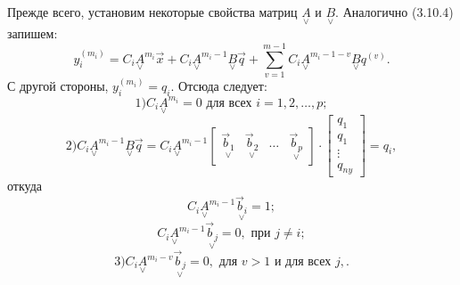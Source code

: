 Прежде всего, установим некоторые свойства матриц $\underset{\lor}{A}$ и $\underset{\lor}{B}$. Аналогично (3.10.4) запишем:
\begin{equation*}
	y_i^{(m_i)}=C_i\underset{\lor}{A}^{m_i}\vec{x}+C_i\underset{\lor}{A}^{m_i-1}\underset{\lor}{B}\vec{q}+\sum_{v=1}^{m-1}C_i\underset{\lor}{A}^{m_i-1-v}\underset{\lor}{B}q^{(v)}.
\end{equation*}
С другой стороны, $y_i^{(m_i)}=q_i$. Отсюда следует:
\begin{equation}
	1) C_i\underset{\lor}{A}^{m_i}=0\text{ для всех }i=1,2,\dots,p;
\end{equation}
\begin{equation}
	2) C_i\underset{\lor}{A}^{m_i-1}\underset{\lor}{B}\vec{q}=C_i\underset{\lor}{A}^{m_i-1}
	\begin{bmatrix}
		 \underset{\lor}{\vec{b}_1} & \underset{\lor}{\vec{b}_2} & \dots & \underset{\lor}{\vec{b}_p}
	\end{bmatrix}\cdot
	\begin{bmatrix}
		 q_1\\q_1\\\vdots\\q_{ny}
	\end{bmatrix}=q_i,
\end{equation}
откуда
\begin{equation}
	C_i\underset{\lor}{A}^{m_i-1}\underset{\lor}{\vec{b}_i}=1;
\end{equation}
\begin{equation}
	C_i\underset{\lor}{A}^{m_i-1}\underset{\lor}{\vec{b}_j}=0,\text{ при } j\neq i;
\end{equation}
\begin{equation}
	3)C_i\underset{\lor}{A}^{m_i-v}\underset{\lor}{\vec{b}_j}=0,\text{ для } v>1 \text{ и для всех } j,.
\end{equation}
